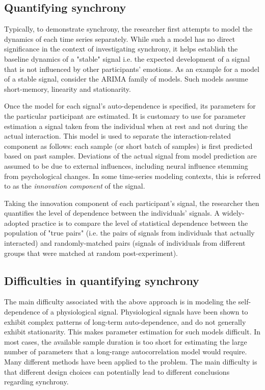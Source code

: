 \documentclass[a4paper, 11pt]{article}      %
\begin{document}
\subsection{Quantifying synchrony}
Typically, to demonstrate synchrony, the researcher first attempts to model the dynamics of each time series separately. While such a model has no direct significance in the context of investigating synchrony, it helps establish the  baseline dynamics of a "stable" signal i.e. the expected development of a signal that is not influenced by other participants' emotions. As an example for a model of a stable signal, consider the ARIMA family of models. Such models assume short-memory, linearity and stationarity. 

Once the model for each signal's auto-dependence is specified, its parameters for the particular participant are estimated. It is customary to use for parameter estimation a signal taken from the individual when at rest and not during the actual interaction. This model is used to separate the interaction-related component as follows: each sample (or short batch of samples) is first predicted based on past samples. Deviations of the actual signal from model prediction are assumed to be due to external influences, including neural influence stemming from psychological changes. In some time-series modeling contexts, this is referred to as the \emph{innovation component} of the signal. 

Taking the innovation component of each participant's signal, the researcher then quantifies the level of dependence between the individuals' signals. A widely-adopted practice is to compare the level of statistical dependence between the population of "true pairs" (i.e. the pairs of signals from individuals that actually interacted) and randomly-matched pairs (signals of individuals from different groups that were matched at random post-experiment).

\subsection{Difficulties in quantifying synchrony}
The main difficulty associated with the above approach is in modeling the self-dependence of a physiological signal. Physiological signals have been shown to exhibit complex patterns of long-term auto-dependence, and do not generally exhibit stationarity. This makes parameter estimation for such models difficult. In most cases, the available sample duration is too short for estimating the large number of parameters that a long-range autocorrelation model would require. Many different methods have been applied to the problem. The main difficulty is that different design choices can potentially lead to different conclusions regarding synchrony.
\end{document}

